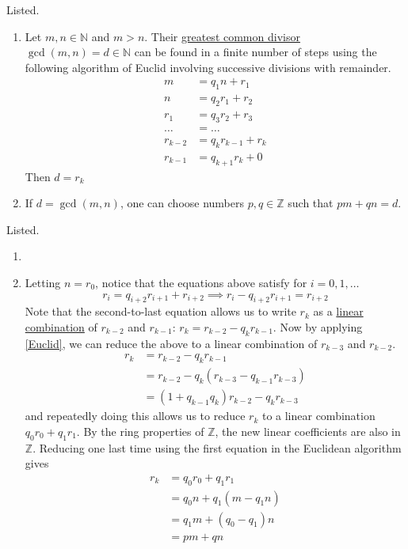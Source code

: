   \begin{exercise}[Zorich 2.2.5]
    Listed. 
    \begin{enumerate}
      \item Let $m, n \in \mathbb{N}$ and $m >n$. Their \hyperref[alg-def:greatest-common-divisor]{greatest common divisor} $\gcd(m, n) = d \in \mathbb{N}$ can be found in a finite number of steps using the following algorithm of Euclid involving successive divisions with remainder. 
      \begin{align*}
        m & = q_1 n + r_1 \\
        n & = q_2 r_1 + r_2 \\
        r_1 & = q_3 r_2 + r_3 \\
        \ldots & = \ldots \\
        r_{k-2} & = q_{k} r_{k-1} + r_{k} \\
        r_{k-1} & = q_{k+1} r_k + 0
      \end{align*}
      Then $d=r_k$ 
      \item If $d = \gcd(m, n)$, one can choose numbers $p, q \in \mathbb{Z}$ such that $pm + qn = d$. 
    \end{enumerate}
  \end{exercise}
  \begin{solution}
    Listed. 
    \begin{enumerate}
      \item 
      \item Letting $n = r_0$, notice that the equations above satisfy for $i=0, 1, \ldots$
      \begin{equation}
        r_i = q_{i+2} r_{i+1} + r_{i+2} \implies r_{i} - q_{i+2} r_{i+1} = r_{i+2} \tag{1} \label{Euclid}
      \end{equation}
      Note that the second-to-last equation allows us to write $r_k$ as a \hyperref[lin-def:linear-combination]{linear combination} of $r_{k-2}$ and $r_{k-1}$: $r_k = r_{k-2} - q_k r_{k-1}$. Now by applying \eqref{Euclid}, we can reduce the above to a linear combination of $r_{k-3}$ and $r_{k-2}$. 
      \begin{align*}
        r_k & = r_{k-2} - q_k r_{k-1} \\
        & = r_{k-2} - q_k (r_{k-3} - q_{k-1} r_{k-3}) \\
        & = (1 + q_{k-1} q_k) r_{k-2} - q_k r_{k-3} 
      \end{align*}
      and repeatedly doing this allows us to reduce $r_k$ to a linear combination $q_0 r_0 + q_1 r_1$. By the ring properties of $\mathbb{Z}$, the new linear coefficients are also in $\mathbb{Z}$. Reducing one last time using the first equation in the Euclidean algorithm gives 
      \begin{align*}
        r_k & = q_0 r_0 + q_1 r_1 \\
        & = q_0 n + q_1 (m - q_1 n) \\
        & = q_1 m + (q_0 - q_1) n \\
        & = p m + q n 
      \end{align*}
    \end{enumerate}
  \end{solution}

